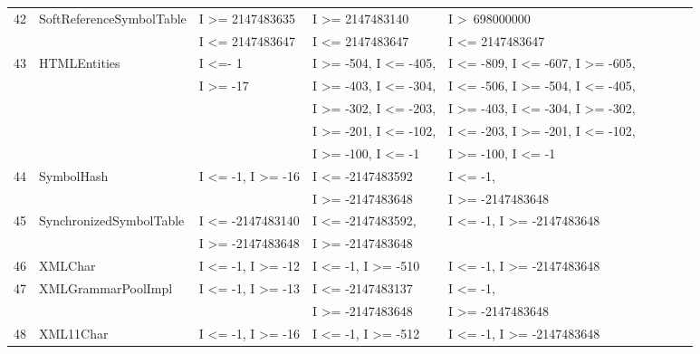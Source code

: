 \documentclass[runningheads,a4paper]{llncs}
\begin{document}
\begin{table}[h]
{{\begin{tabular}{|l|l|l|l|l|l|l|l|l|}
42	& SoftReferenceSymbolTable	& I \textgreater= 2147483635				& I \textgreater= 2147483140			& I \textgreater~698000000					\\ 
	&                                             & I \textless= 2147483647					& I \textless= 2147483647				&  I \textless= 2147483647					\\
43	& HTMLEntities				& I \textless=- 1								& I \textgreater= -504, I \textless= -405,	&  I \textless= -809, I \textless= -607, I \textgreater= -605,    		\\ 
	&                         			& I \textgreater= -17							& I \textgreater= -403, I \textless= -304, 	&  I \textless= -506, I \textgreater= -504, I \textless= -405,		 \\	
	&                         			& 											& I \textgreater= -302, I \textless= -203,	&  I \textgreater= -403, I \textless= -304, I \textgreater= -302,		 \\	
	&                        				& 											& I \textgreater= -201, I \textless= -102, 	&  I \textless= -203, I \textgreater= -201, I \textless= -102,		 \\	
	&                         			& 											& I \textgreater= -100, I \textless= -1		&  I \textgreater= -100, I \textless= -1				 			 \\	
44	& SymbolHash				& I \textless= -1,  I \textgreater= -16			& I \textless= -2147483592			 	& I \textless= -1, 							\\ 
	&							&											& I \textgreater= -2147483648			& I \textgreater= -2147483648				\\
45	& SynchronizedSymbolTable	& I \textless= -2147483140					& I \textless= -2147483592,				& I \textless= -1, I \textgreater= -2147483648	\\ 
	&                                             & I \textgreater= -2147483648				& I \textgreater= -2147483648 			&  			   								\\
46	& XMLChar					& I \textless= -1, I \textgreater= -12			& I \textless= -1, I \textgreater= -510		& I \textless= -1, I \textgreater= -2147483648	\\
47	& XMLGrammarPoolImpl		& I \textless= -1, I \textgreater= -13			& I \textless= -2147483137 				& I \textless= -1, 							\\ 
	&							&											& I \textgreater= -2147483648			& I \textgreater= -2147483648				\\
48	& XML11Char				& I \textless= -1, I \textgreater= -16			& I \textless= -1, I \textgreater= -512		& I \textless= -1, I \textgreater= -2147483648	\\ 

\end{tabular}}}
\end{table}
\end{document}
